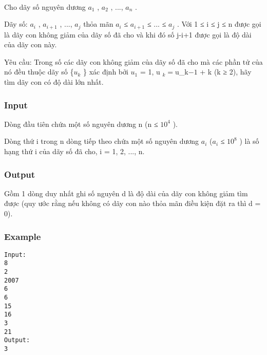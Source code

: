 

 

Cho dãy số nguyên dương $a_{1}$ , $a_{2}$ , ..., $a_{n}$ .

Dãy số: $a_{i}$ , $a_{i+1}$ , ..., $a_{j}$ thỏa mãn $a_{i}$ ≤ $a_{i+1}$ ≤ ... ≤ $a_{j}$ . Với 1 ≤ i ≤ j ≤ n được gọi là dãy con không giảm của dãy số đã cho và khi đó số j-i+1 được gọi là độ dài của dãy con này.

Yêu cầu: Trong số các dãy con không giảm của dãy số đã cho mà các phần tử của nó đều thuộc dãy số \{$u_{k}$ \} xác định bởi $u_{1}$ = 1, u $_ k = $u_{k}$ -1 $ + k (k ≥ 2), hãy tìm dãy con có độ dài lớn nhất.

\subsubsection{Input}

Dòng đầu tiên chứa một số nguyên dương n (n ≤ $10^{4}$ ).

Dòng thứ i trong n dòng tiếp theo chứa một số nguyên dương $a_{i}$ ($a_{i}$ ≤ $10^{8}$ ) là số hạng thứ i của dãy số đã cho, i = 1, 2, ..., n.

\subsubsection{Output}

Gồm 1 dòng duy nhất ghi số nguyên d là độ dài của dãy con không giảm tìm được (quy ước rằng nếu không có dãy con nào thỏa mãn điều kiện đặt ra thì d = 0).

\subsubsection{Example}
\begin{verbatim}
Input:
8
2
2007
6
6
15
16
3
21
Output:
3

\end{verbatim}
